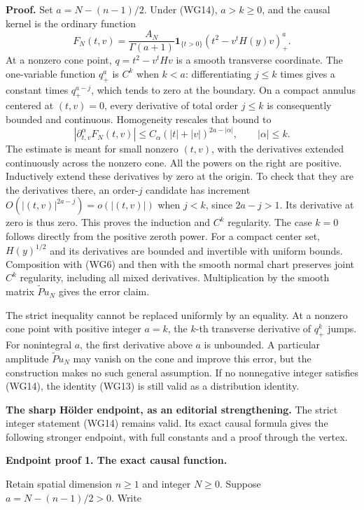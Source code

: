 \documentclass[
  11pt,
]{article}
\begin{document}
\textbf{Proof.} Set \(a=N-(n-1)/2\). Under (WG14), \(a>k\geq0\), and the
causal kernel is the ordinary function \[
 F_N(t,v)=\frac{A_N}{\Gamma(a+1)}
             \boldsymbol1_{\{t>0\}}(t^2-v^tH(y)v)_+^a.
 \tag{WG15}
\] At a nonzero cone point, \(q=t^2-v^tHv\) is a smooth transverse
coordinate. The one-variable function \(q_+^a\) is \(C^k\) when \(k<a\):
differentiating \(j\leq k\) times gives a constant times \(q_+^{a-j}\),
which tends to zero at the boundary. On a compact annulus centered at
\((t,v)=0\), every derivative of total order \(j\leq k\) is consequently
bounded and continuous. Homogeneity rescales that bound to \[
 |\partial_{t,v}^{\alpha}F_N(t,v)|
       \leq C_\alpha (|t|+|v|)^{2a-|\alpha|},
       \qquad |\alpha|\leq k.
 \tag{WG16}
\] The estimate is meant for small nonzero \((t,v)\), with the
derivatives extended continuously across the nonzero cone. All the
powers on the right are positive. Inductively extend these derivatives
by zero at the origin. To check that they are the derivatives there, an
order-\(j\) candidate has increment \(O(|(t,v)|^{2a-j})=o(|(t,v)|)\)
when \(j<k\), since \(2a-j>1\). Its derivative at zero is thus zero.
This proves the induction and \(C^k\) regularity. The case \(k=0\)
follows directly from the positive zeroth power. For a compact center
set, \(H(y)^{1/2}\) and its derivatives are bounded and invertible with
uniform bounds. Composition with (WG6) and then with the smooth normal
chart preserves joint \(C^k\) regularity, including all mixed
derivatives. Multiplication by the smooth matrix \(\widetilde Pu_N\)
gives the error claim.

The strict inequality cannot be replaced uniformly by an equality. At a
nonzero cone point with positive integer \(a=k\), the \(k\)-th
transverse derivative of \(q_+^k\) jumps. For nonintegral \(a\), the
first derivative above \(a\) is unbounded. A particular amplitude
\(\widetilde Pu_N\) may vanish on the cone and improve this error, but
the construction makes no such general assumption. If no nonnegative
integer satisfies (WG14), the identity (WG13) is still valid as a
distribution identity.

\textbf{The sharp Hölder endpoint, as an editorial strengthening.} The
strict integer statement (WG14) remains valid. Its exact causal formula
gives the following stronger endpoint, with full constants and a proof
through the vertex.

\textbf{Endpoint proof 1. The exact causal function.}

Retain spatial dimension \(n\geq 1\) and integer \(N\geq 0\). Suppose
\(a=N-(n-1)/2>0\). Write
\end{document}
